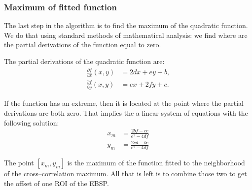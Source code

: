 \subsubsection{Maximum of fitted function}

The last step in the algorithm is to find the maximum of the quadratic function. We do that using standard methods of mathematical analysis: we find where are the partial derivations of the function equal to zero.

The partial derivations of the quadratic function are:
\begin{align*}
\frac{\partial f}{\partial x}(x,y) &= 2dx + ey + b,\\
\frac{\partial f}{\partial y}(x,y) &= ex + 2fy + c.
\end{align*}

If the function has an extreme, then it is located at the point where the partial derivations are both zero. That implies the a linear system of equations with the following solution:
\begin{align*}
x_m &= \frac{2bf - ce}{e^2 - 4df}\\
y_m &= \frac{2cd - be}{e^2 - 4df}
\end{align*}

The point $[x_m, y_m]$ is the maximum of the function fitted to the neighborhood of the cross--correlation maximum. All that is left is to combine those two to get the offset of one ROI of the EBSP.
